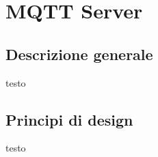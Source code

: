 
\section{MQTT Server}
\subsection{Descrizione generale}
testo
\subsection{Principi di design}
testo


